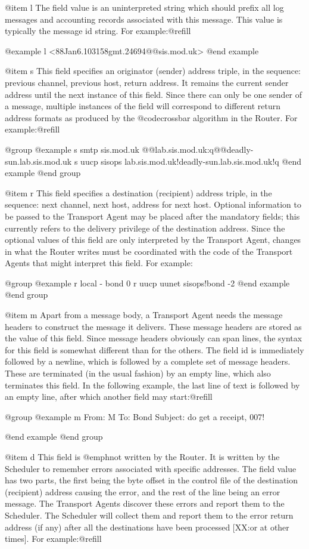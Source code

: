 {{@item l
The field value is an uninterpreted string which should prefix all log
messages and accounting records associated with this message.  This value
is typically the message id string.  For example:@refill

@example
l <88Jan6.103158gmt.24694@@sis.mod.uk>
@end example

@item s
This field specifies an originator (sender) address triple, in the sequence:
previous channel, previous host, return address.  It remains the current
sender address until the next instance of this field.  Since there can only
be one sender of a message, multiple instances of the field will correspond
to different return address formats as produced by the @code{crossbar}
algorithm in the Router.  For example:@refill

@group
@example
s smtp sis.mod.uk @@lab.sis.mod.uk:q@@deadly-sun.lab.sis.mod.uk
s uucp sisops lab.sis.mod.uk!deadly-sun.lab.sis.mod.uk!q
@end example
@end group

@item r
This field specifies a destination (recipient) address triple, in the
sequence: next channel, next host, address for next host.  Optional
information to be passed to the Transport Agent may be placed after the
mandatory fields; this currently refers to the delivery privilege of the
destination address.  Since the optional values of this field are only
interpreted by the Transport Agent, changes in what the Router writes
must be coordinated with the code of the Transport Agents that might
interpret this field.  For example:

@group
@example
r local - bond 0
r uucp uunet sisops!bond -2
@end example
@end group

@item m
Apart from a message body, a Transport Agent needs the message headers to
construct the message it delivers.  These message headers are stored as the
value of this field.  Since message headers obviously can span lines, the
syntax for this field is somewhat different than for the others.  The field
id is immediately followed by a newline, which is followed by a complete set
of message headers.  These are terminated (in the usual fashion) by an empty
line, which also terminates this field.  In the following example, the last
line of text is followed by an empty line, after which another field may
start:@refill

@group
@example
m
From: M
To: Bond
Subject: do get a receipt, 007!

@end example
@end group

@item d
This field is @emph{not} written by the Router.  It is written by the
Scheduler to remember errors associated with specific addresses.  The field
value has two parts, the first being the byte offset in the control file of
the destination (recipient) address causing the error, and the rest of the
line being an error message.  The Transport Agents discover these errors
and report them to the Scheduler.  The Scheduler will collect them and
report them to the error return address (if any) after all the destinations
have been processed [XX:or at other times].  For example:@refill

}}
